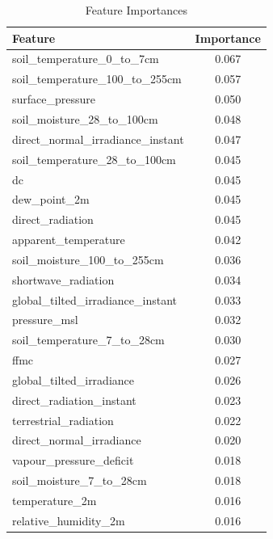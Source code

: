 \begin{table}[H]
	\caption{Feature Importances}
	\centering
	\label{feature_importances}
	\begin{tabular}{lc}
		\hline
		Feature                                & Importance \\ \hline
		soil\_temperature\_0\_to\_7cm         & 0.067       \\ 
		soil\_temperature\_100\_to\_255cm     & 0.057       \\ 
		surface\_pressure                      & 0.050       \\ 
		soil\_moisture\_28\_to\_100cm         & 0.048       \\ 
		direct\_normal\_irradiance\_instant    & 0.047       \\ 
		soil\_temperature\_28\_to\_100cm       & 0.045       \\ 
		dc                                     & 0.045       \\ 
		dew\_point\_2m                         & 0.045       \\ 
		direct\_radiation                      & 0.045       \\ 
		apparent\_temperature                 & 0.042       \\ 
		soil\_moisture\_100\_to\_255cm         & 0.036       \\ 
		shortwave\_radiation                   & 0.034       \\ 
		global\_tilted\_irradiance\_instant    & 0.033       \\ 
		pressure\_msl                          & 0.032       \\ 
		soil\_temperature\_7\_to\_28cm         & 0.030       \\ 
		ffmc                                   & 0.027       \\ 
		global\_tilted\_irradiance             & 0.026       \\ 
		direct\_radiation\_instant            & 0.023       \\ 
		terrestrial\_radiation                 & 0.022       \\ 
		direct\_normal\_irradiance             & 0.020       \\ 
		vapour\_pressure\_deficit             & 0.018       \\ 
		soil\_moisture\_7\_to\_28cm            & 0.018       \\ 
		temperature\_2m                        & 0.016       \\ 
		relative\_humidity\_2m                 & 0.016       \\ 

\end{tabular}
\end{table}
